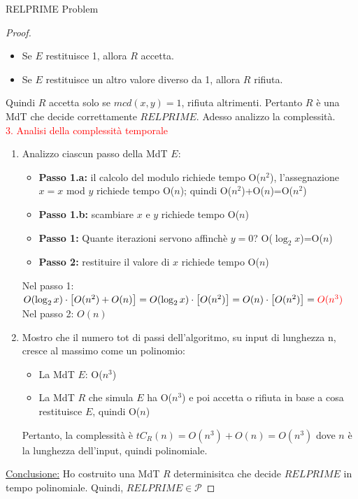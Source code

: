 \documentclass{article}  %
\theoremstyle{definition}
\begin{document}
\begin{theorem}{RELPRIME Problem}
\begin{proof}
\begin{enumerate}
			      \begin{itemize}
				      \item Se $E$ restituisce 1, allora $R$ accetta.
				      \item Se $E$ restituisce un altro valore diverso da 1, allora $R$ rifiuta.
			      \end{itemize}
		\end{enumerate}
		Quindi $R$ accetta solo se $mcd(x,y)=1$, rifiuta altrimenti. Pertanto $R$ è una MdT che decide correttamente $RELPRIME$. Adesso analizzo la complessità. \\
		\textcolor{red}{3. Analisi della complessità temporale}
		\begin{enumerate}
			\item Analizzo ciascun passo della MdT $E$:
			      \begin{itemize}
				      \item \textbf{Passo 1.a:} il calcolo del modulo richiede tempo O($n^2$), l'assegnazione $x=x$ mod $y$ richiede tempo O($n$); quindi O($n^2$)+O($n$)=O($n^2$)
				      \item \textbf{Passo 1.b:} scambiare $x$ e $y$ richiede tempo O($n$)
				      \item \textbf{Passo 1:} Quante iterazioni servono affinchè $y=0$? O($\log_2x$)=O($n$)
				      \item \textbf{Passo 2:} restituire il valore di $x$ richiede tempo O($n$)
			      \end{itemize}
			      Nel passo 1: $O(\log_2x)\cdot\big[O(n^2)+O(n)\big]=O(\log_2x)\cdot\big[O(n^2)\big]=O(n)\cdot\big[O(n^2)\big]=\textcolor{red}{O(n^3)}$ \\
			      Nel passo 2: $O(n)$
			\item Mostro che il numero tot di passi dell'algoritmo, su input di lunghezza n, cresce
			      al massimo come un polinomio:
				  \begin{itemize}
					\item La MdT $E$: O($n^3$)
					\item La MdT $R$ che simula $E$ ha O($n^3$) e poi accetta o rifiuta in base a cosa restituisce $E$, quindi O($n$)
				  \end{itemize}
			Pertanto, la complessità è $tC_R(n)=O(n^3)+O(n)=O(n^3)$ dove $n$ è la lunghezza dell'input, quindi polinomiale.
		\end{enumerate}
		\underline{Conclusione:} Ho costruito una MdT $R$ determinisitca che decide $RELPRIME$ in tempo polinomiale. Quindi, $RELPRIME \in \mathcal{P}$
	\end{proof}
\end{theorem}
\end{document}
